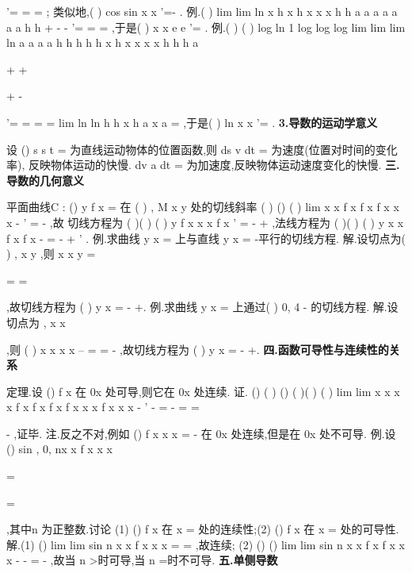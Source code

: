 '=
=
=
; 
类似地,(
)
cos
sin
x
x
'=-
. 
\textcolor{lyred}{例}.(
)
lim
lim
ln
x h
x
h
x
x
x
h
h
a
a
a
a
a
a
a
h
h
+
\to 
\to 
-
-
'=
=
=
,于是(
)
x
x
e
e
'=
. 
\textcolor{lyred}{例}.(
)
(
)
log
ln 1
log
log
log
lim
lim
lim
ln
a
a
a
a
h
h
h
h
h
x
h
x
x
x
x
h
h
h
a
\to 
\to 
\to 




+
+




+
-




'=
=
=
= 
lim
ln
ln
h
h
x
h
a
x
a
\to 
=
,于是(
)
ln x
x
'=
. 
{\bfseries \textcolor{lyred}{3.导数的运动学意义}}

设
()
s
s t
=
为直线运动物体的位置函数,则
ds
v
dt
=
为\textcolor{lyred}{速度}(位置对时间的变化率), 
反映物体运动的快慢.
dv
a
dt
=
为\textcolor{lyred}{加速度},反映物体运动速度变化的快慢. 
\vspace{4pt}
{\bfseries \textcolor{lyred}{三.导数的几何意义}}

平面曲线C :
()
y
f x
=
在
(
)
,
M x
y
处的切线斜率
(
)
()
(
)
lim
x
x
f x
f x
f
x
x
x
\to 
-
'
=
-
,故 
切线方程为
(
)(
)
(
)
y
f
x
x
x
f x
'
=
-
+
,法线方程为
(
)(
)
(
)
y
x
x
f x
f
x
-
=
-
+
'
. 
\textcolor{lyred}{例}.求曲线
y
x
=
上与直线
y
x
=
-平行的切线方程. 
解.设切点为(
)
,
x
y
,则
x
x
y
=

=
\Rightarrow 
=

,故切线方程为
(
)
y
x
=
-
+. 
\textcolor{lyred}{例}.求曲线
y
x
=
上通过(
)
0, 4
-
的切线方程. 
解.设切点为
,
x x






,则
(
)
x
x
x
x
--
=
\Rightarrow 
=
-
,故切线方程为
(
)
y
x
=
-
+. 
\vspace{4pt}
{\bfseries \textcolor{lyred}{四.函数可导性与连续性的关系}}

\textcolor{lyred}{定理}.设
()
f x 在
0x 处可导,则它在
0x 处连续. 
\textcolor{lyred}{证}.
()
(
)
()
(
)(
)
(
)
lim
lim
x
x
x
x
f x
f x
f x
f x
x
x
f
x
x
x
\to 
\to 
-
'
-
=
-
=
\cdots 
=




-
,证毕. 
\textcolor{lyred}{注}.反之不对,例如
()
f x
x
x
=
-
在
0x 处连续,但是在
0x 处不可导. 
\textcolor{lyred}{例}.设
()
sin
,
0,
nx
x
f x
x
x

\neq 

=

=

,其中n 为正整数.讨论 
(1)
()
f x 在
x =
处的连续性;(2)
()
f x 在
x =
处的可导性. 
解.(1)
()
lim
lim
sin
n
x
x
f x
x
x
\to 
\to 
=
=
,故连续; 
(2)
()
()
lim
lim
sin
n
x
x
f x
f
x
x
x
-
\to 
\to 
-
=
-
,故当
n >时可导,当
n =时不可导. 
\vspace{4pt}
{\bfseries \textcolor{lyred}{五.单侧导数}}

